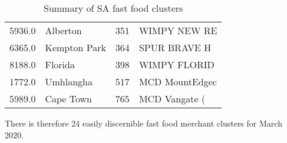 \begin{center}
\begin{table}[htb]
\begin{tabular}{rlrl}
                5936.0 &          Alberton &          351 &    WIMPY NEW RE \\
                6365.0 &      Kempton Park &          364 &    SPUR BRAVE H \\
                8188.0 &           Florida &          398 &    WIMPY FLORID \\
                1772.0 &         Umhlangha &          517 &  MCD MountEdgec \\
                5989.0 &         Cape Town &          765 &   MCD Vangate ( \\
            \bottomrule
            \end{tabular}
            \caption{Summary of SA fast food clusters}
        \label{tab:summary_fastfood_clusters}
    \end{table}
\end{center}

There is therefore 24 easily discernible fast food merchant clusters for March 2020.